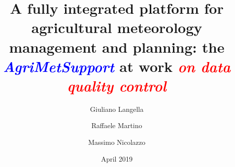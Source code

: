 \documentclass[authoryear,preprint,review,12pt]{elsarticle}
\newcommand{\note}[1]{\emph{\textcolor{red}{#1}}}
\newcommand{\update}[1]{\emph{\textcolor{blue}{#1}}}
\newcommand{\gci}{\update{AgriMetSupport}\xspace}
\begin{document}
\begin{frontmatter}



\title{A fully integrated platform for agricultural meteorology management and planning: the \gci at work \note{on data quality control} }


\author[dia]{Giuliano Langella}
\address[dia]{Department of Agriculture, University of Naples Federico II, Via Università 100, 80055 Portici, NA, Italy}

\author[deeit]{Raffaele Martino}
\author[deeit]{Massimo Nicolazzo}
\address[deeit]{Department of Electrical Engineering and Information Technology, University of Naples Federico II, Via Claudio 21, 80125 Naples, NA, Italy}

\date{April 2019}

\begin{abstract}


\end{abstract}
\end{frontmatter}
\end{document}
